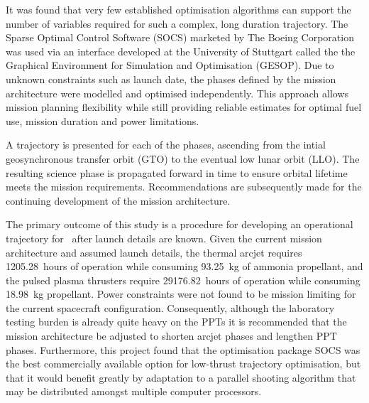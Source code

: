 It was found that very few established optimisation algorithms can support the number of variables required for such a complex, long duration trajectory. The Sparse Optimal Control Software (SOCS) marketed by The Boeing Corporation was used via an interface developed at the University of Stuttgart called the the Graphical Environment for Simulation and Optimisation (GESOP). Due to unknown constraints such as launch date, the phases defined by the mission architecture were modelled and optimised independently. This approach allows mission planning flexibility while still providing reliable estimates for optimal fuel use, mission duration and power limitations.

A trajectory is presented for each of the phases, ascending from the intial geosynchronous transfer orbit (GTO) to the eventual low lunar orbit (LLO). The resulting science phase is propagated forward in time to ensure orbital lifetime meets the mission requirements. Recommendations are subsequently made for the continuing development of the mission architecture.

The primary outcome of this study is a procedure for developing an operational trajectory for \BW\ after launch details are known. Given the current mission architecture and assumed launch details, the thermal arcjet requires 1205.28~hours of operation while consuming 93.25~kg of ammonia propellant, and the pulsed plasma thrusters require 29176.82~hours of operation while consuming 18.98~kg propellant. Power constraints were not found to be mission limiting for the current spacecraft configuration. Consequently, although the laboratory testing burden is already quite heavy on the PPTs it is recommended that the mission architecture be adjusted to shorten arcjet phases and lengthen PPT phases. Furthermore, this project found that the optimisation package SOCS was the best commercially available option for low-thrust trajectory optimisation, but that it would benefit greatly by adaptation to a parallel shooting algorithm that may be distributed amongst multiple computer processors.

\vfill